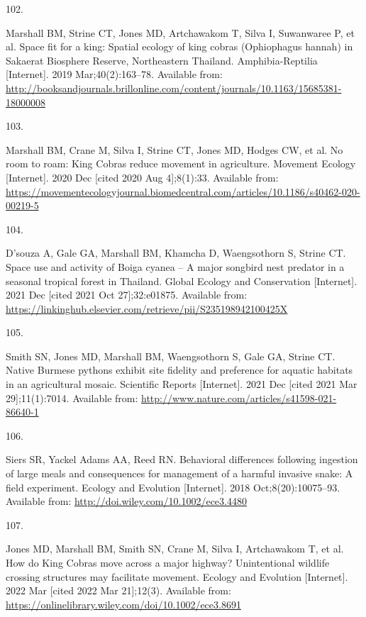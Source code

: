 \documentclass[10pt,a4paper]{article}
\newlength{\cslhangindent}
\newlength{\csllabelwidth}
\newlength{\cslentryspacingunit} %
\newenvironment{CSLReferences}[2] %
 {%
  \setlength{\parindent}{0pt}
  \ifodd #1
  \let\oldpar\par
  \def\par{\hangindent=\cslhangindent\oldpar}
  \fi
  \setlength{\parskip}{#2\cslentryspacingunit}
 }%
 {}
\newcommand{\CSLLeftMargin}[1]{\parbox[t]{\csllabelwidth}{#1}}
\newcommand{\CSLRightInline}[1]{\parbox[t]{\linewidth - \csllabelwidth}{#1}\break}
\begin{document}
\begin{CSLReferences}{0}{0}
\leavevmode{}%
\CSLLeftMargin{102. }
\CSLRightInline{Marshall BM, Strine CT, Jones MD, Artchawakom T, Silva I, Suwanwaree P, et al. Space fit for a king: Spatial ecology of king cobras ({Ophiophagus} hannah) in {Sakaerat} {Biosphere} {Reserve}, {Northeastern} {Thailand}. Amphibia-Reptilia {[}Internet{]}. 2019 Mar;40(2):163--78. Available from: \url{http://booksandjournals.brillonline.com/content/journals/10.1163/15685381-18000008}}

\leavevmode{}%
\CSLLeftMargin{103. }
\CSLRightInline{Marshall BM, Crane M, Silva I, Strine CT, Jones MD, Hodges CW, et al. No room to roam: {King} {Cobras} reduce movement in agriculture. Movement Ecology {[}Internet{]}. 2020 Dec {[}cited 2020 Aug 4{]};8(1):33. Available from: \url{https://movementecologyjournal.biomedcentral.com/articles/10.1186/s40462-020-00219-5}}

\leavevmode{}%
\CSLLeftMargin{104. }
\CSLRightInline{D'souza A, Gale GA, Marshall BM, Khamcha D, Waengsothorn S, Strine CT. Space use and activity of {Boiga} cyanea -- {A} major songbird nest predator in a seasonal tropical forest in {Thailand}. Global Ecology and Conservation {[}Internet{]}. 2021 Dec {[}cited 2021 Oct 27{]};32:e01875. Available from: \url{https://linkinghub.elsevier.com/retrieve/pii/S235198942100425X}}

\leavevmode{}%
\CSLLeftMargin{105. }
\CSLRightInline{Smith SN, Jones MD, Marshall BM, Waengsothorn S, Gale GA, Strine CT. Native {Burmese} pythons exhibit site fidelity and preference for aquatic habitats in an agricultural mosaic. Scientific Reports {[}Internet{]}. 2021 Dec {[}cited 2021 Mar 29{]};11(1):7014. Available from: \url{http://www.nature.com/articles/s41598-021-86640-1}}

\leavevmode{}%
\CSLLeftMargin{106. }
\CSLRightInline{Siers SR, Yackel Adams AA, Reed RN. Behavioral differences following ingestion of large meals and consequences for management of a harmful invasive snake: {A} field experiment. Ecology and Evolution {[}Internet{]}. 2018 Oct;8(20):10075--93. Available from: \url{http://doi.wiley.com/10.1002/ece3.4480}}

\leavevmode{}%
\CSLLeftMargin{107. }
\CSLRightInline{Jones MD, Marshall BM, Smith SN, Crane M, Silva I, Artchawakom T, et al. How do {King} {Cobras} move across a major highway? {Unintentional} wildlife crossing structures may facilitate movement. Ecology and Evolution {[}Internet{]}. 2022 Mar {[}cited 2022 Mar 21{]};12(3). Available from: \url{https://onlinelibrary.wiley.com/doi/10.1002/ece3.8691}}


\end{CSLReferences}
\end{document}
